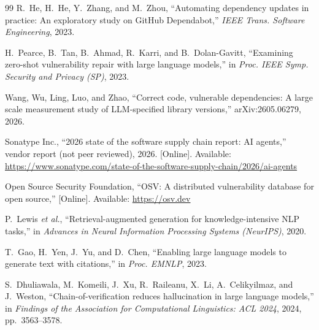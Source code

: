 \documentclass[conference]{IEEEtran}
\begin{document}
\begin{thebibliography}{99}
R.~He, H.~He, Y.~Zhang, and M.~Zhou,
``Automating dependency updates in practice: An exploratory study on GitHub Dependabot,''
\emph{IEEE Trans. Software Engineering}, 2023.

H.~Pearce, B.~Tan, B.~Ahmad, R.~Karri, and B.~Dolan-Gavitt,
``Examining zero-shot vulnerability repair with large language models,''
in \emph{Proc. IEEE Symp. Security and Privacy (SP)}, 2023.

Wang, Wu, Ling, Luo, and Zhao,
``Correct code, vulnerable dependencies: A large scale measurement study of LLM-specified library versions,''
arXiv:2605.06279, 2026. %

Sonatype Inc., ``2026 state of the software supply chain report: AI agents,'' vendor report (not peer
reviewed), 2026. [Online]. Available: \url{https://www.sonatype.com/state-of-the-software-supply-chain/2026/ai-agents}

Open Source Security Foundation, ``OSV: A distributed vulnerability database for open source,'' [Online].
Available: \url{https://osv.dev}

P.~Lewis \emph{et al.},
``Retrieval-augmented generation for knowledge-intensive NLP tasks,''
in \emph{Advances in Neural Information Processing Systems (NeurIPS)}, 2020.

T.~Gao, H.~Yen, J.~Yu, and D.~Chen,
``Enabling large language models to generate text with citations,''
in \emph{Proc. EMNLP}, 2023.

S.~Dhuliawala, M.~Komeili, J.~Xu, R.~Raileanu, X.~Li, A.~Celikyilmaz, and J.~Weston,
``Chain-of-verification reduces hallucination in large language models,''
in \emph{Findings of the Association for Computational Linguistics: ACL 2024}, 2024, pp.~3563--3578.

\end{thebibliography}
\end{document}
